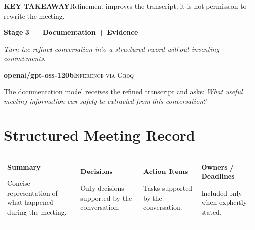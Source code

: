 \documentclass[9pt,a4paper]{extarticle}
\newcommand{\tagline}[1]{{\large\color{charcoal}\itshape #1\par}}
\begin{document}
\vspace{4pt}
\begin{notecard}\textbf{KEY TAKEAWAY}\quad Refinement improves the transcript; it is not permission to rewrite the meeting.\end{notecard}
\newpage

{\fontsize{22}{25}\selectfont\bfseries Stage 3 — Documentation + Evidence\par}
\tagline{Turn the refined conversation into a structured record without inventing commitments.}
\vspace{4pt}

\begin{darkcard}
\textbf{openai/gpt-oss-120b}\hfill \textsc{Inference via Groq}\par
\vspace{2pt}
The documentation model receives the refined transcript and asks: \textit{What useful meeting information can safely be extracted from this conversation?}
\end{darkcard}

\vspace{4pt}
\section*{Structured Meeting Record}
\begin{tabularx}{\textwidth}{@{}XXXX@{}}
\begin{card}\textbf{Summary}\par Concise representation of what happened during the meeting.
\end{card}&
\begin{card}\textbf{Decisions}\par Only decisions supported by the conversation.
\end{card}&
\begin{card}\textbf{Action Items}\par Tasks supported by the conversation.
\end{card}&
\begin{card}\textbf{Owners / Deadlines}\par Included only when explicitly stated.
\end{card}
\end{tabularx}

\vspace{4pt}
\end{document}
